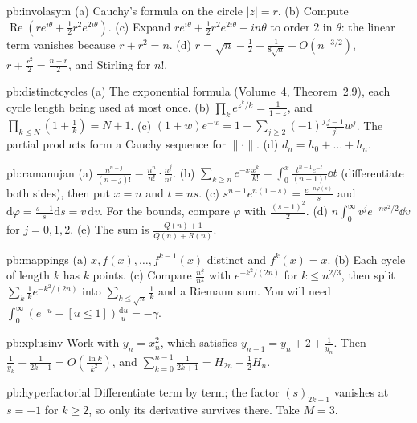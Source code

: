 \begin{hint}{pb:involasym}
(a) Cauchy's formula on the circle $|z|=r$. (b) Compute $\operatorname{Re}(re^{i\theta}+\frac12r^2e^{2i\theta})$. (c) Expand $re^{i\theta}+\frac12r^2e^{2i\theta}-in\theta$ to order $2$ in $\theta$: the
linear term vanishes because $r+r^2=n$. (d) $r=\sqrt n-\frac12+\frac1{8\sqrt n}+O(n^{-3/2})$, $r+\frac{r^2}2=\frac{n+r}2$, and Stirling for $n!$.
\end{hint}

\begin{hint}{pb:distinctcycles}
(a) The exponential formula (Volume~4, Theorem~2.9), each cycle length being used at most once. (b) $\prod_ke^{z^k/k}=\frac1{1-z}$, and $\prod_{k\le N}(1+\frac1k)=N+1$.
(c) $(1+w)e^{-w}=1-\sum_{j\ge2}(-1)^j\frac{j-1}{j!}w^j$. The partial products form a Cauchy sequence for $\|\cdot\|$. (d) $d_n=h_0+\dots+h_n$.
\end{hint}

\begin{hint}{pb:ramanujan}
(a) $\frac{n^{n-j}}{(n-j)!}=\frac{n^n}{n!}\cdot\frac{n^{\underline j}}{n^j}$. (b) $\sum_{k\ge n}e^{-x}\frac{x^k}{k!}=\int_0^x\frac{t^{n-1}e^{-t}}{(n-1)!}\dd t$ (differentiate both sides), then put $x=n$ and $t=ns$. (c) $s^{n-1}e^{n(1-s)}=\frac{e^{-n\varphi(s)}}s$
and $\mathrm d\varphi=\frac{s-1}s\mathrm ds=v\,\mathrm dv$. For the bounds, compare $\varphi$ with $\frac{(s-1)^2}2$. (d) $n\int_0^\infty v^je^{-nv^2/2}\dd v$ for $j=0,1,2$. (e) The sum is
$\frac{Q(n)+1}{Q(n)+R(n)}$.
\end{hint}

\begin{hint}{pb:mappings}
(a) $x,f(x),\dots,f^{k-1}(x)$ distinct and $f^k(x)=x$. (b) Each cycle of length $k$ has $k$ points. (c) Compare $\frac{n^{\underline k}}{n^k}$ with $e^{-k^2/(2n)}$ for $k\le n^{2/3}$, then split
$\sum_k\frac1ke^{-k^2/(2n)}$ into $\sum_{k\le\sqrt n}\frac1k$ and a Riemann sum. You will need $\int_0^\infty(e^{-u}-[u\le1])\frac{\mathrm du}u=-\gamma$.
\end{hint}

\begin{hint}{pb:xplusinv}
Work with $y_n=x_n^2$, which satisfies $y_{n+1}=y_n+2+\frac1{y_n}$. Then $\frac1{y_k}-\frac1{2k+1}=O(\frac{\ln k}{k^2})$, and $\sum_{k=0}^{n-1}\frac1{2k+1}=H_{2n}-\frac12H_n$.
\end{hint}

\begin{hint}{pb:hyperfactorial}
Differentiate term by term; the factor $(s)_{2k-1}$ vanishes at $s=-1$ for $k\ge2$, so only its derivative survives there. Take $M=3$.
\end{hint}

